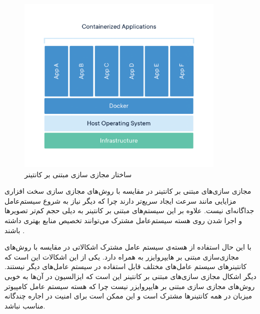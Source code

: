       \begin{figure}[]
        \centerline{\includegraphics[width=10cm]{graphics/chapter_2/container}}
        \caption{ساختار مجازی سازی مبتنی بر کانتینر \cite{2018are}}
        \label{fig:chapter_2:container}
      \end{figure}
      
      مجازی سازی‌های مبتنی بر کانتینر در مقایسه با روش‌های مجازی سازی سخت افزاری مزایایی مانند سرعت ایجاد سریع‌تر دارند چرا که دیگر نیاز به شروع سیستم‌عامل جداگانه‌ای نیست.
      علاوه بر این سیستم‌های مبتنی بر کانتینر به دیلی حجم کم‌تر  تصویر‌ها و اجرا شدن روی هسته سیستم‌عامل مشترک می‌توانند تخصیص منابع بهتری داشته باشند \cite{morabito2015hypervisors}.

      با این حال استفاده از هسته‌ی سیستم عامل مشترک اشکالاتی در مقایسه با روش‌های مجازی‌سازی مبتنی بر {هایپروایزر} به همراه دارد.
      یکی از این اشکالات این است که کانتینر‌های سیستم عامل‌های مختلف قابل استفاده در سیستم عامل‌های دیگر نیستند.
      دیگر اشکال مجازی سازی‌های مبتنی بر کانتینر این است که ایزالسیون در آن‌ها به خوبی روش‌های مجازی سازی مبتنی بر {هایپروایزر} نیست \cite{bui2015analysis} چرا که هسته سیستم عامل کامپیوتر میزبان در همه کانتینر‌ها مشترک است و این ممکن است برای امنیت در اجاره چندگانه مناسب نباشد.

